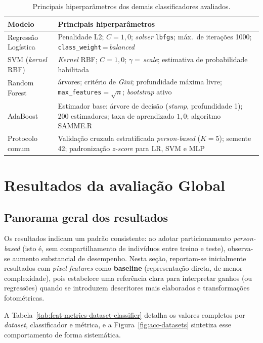 \documentclass[11pt,a4paper]{article}
\begin{document}
\begin{table}[H]
\centering
\caption{Principais hiperparâmetros dos demais classificadores avaliados.}
\label{tab:hiperparametros-gerais}
\small
\begin{tabularx}{\textwidth}{>{\raggedright\arraybackslash}p{3.4cm} >{\raggedright\arraybackslash}X}
\toprule
\textbf{Modelo} & \textbf{Principais hiperparâmetros} \\
\midrule
Regressão Logística & Penalidade L2; \(C=1{,}0\); \textit{solver} \texttt{lbfgs}; máx.\ de iterações 1000; \texttt{class\_weight}\,=\,\textit{balanced} \\
SVM (\textit{kernel} RBF) & \textit{Kernel} RBF; \(C=1{,}0\); \(\gamma=\)\,\textit{scale}; estimativa de probabilidade habilitada \\
Random Forest & 300 árvores; critério de \textit{Gini}; profundidade máxima livre; \texttt{max\_features}\(=\sqrt{n}\); \textit{bootstrap} ativo \\
AdaBoost & Estimador base: árvore de decisão (\textit{stump}, profundidade 1); 200 estimadores; taxa de aprendizado \(1{,}0\); algoritmo SAMME.R \\
Protocolo comum & Validação cruzada estratificada \textit{person-based} (\(K=5\)); semente 42; padronização \textit{z-score} para LR, SVM e MLP \\
\bottomrule
\end{tabularx}
\end{table}

\section{Resultados da avaliação Global}

\subsection{Panorama geral dos resultados}
Os resultados indicam um padrão consistente: ao adotar particionamento \textit{person-based} (isto é, sem compartilhamento de indivíduos entre treino e teste), observa-se aumento substancial de desempenho. Nesta seção, reportam-se inicialmente resultados com \emph{pixel features} como \textbf{baseline} (representação direta, de menor complexidade), pois estabelece uma referência clara para interpretar ganhos (ou regressões) quando se introduzem descritores mais elaborados e transformações fotométricas.

A Tabela~\ref{tab:feat-metrics-dataset-classifier} detalha os valores completos por \textit{dataset}, classificador e métrica, e a Figura~\ref{fig:acc-datasets} sintetiza esse comportamento de forma sistemática.
\end{document}
